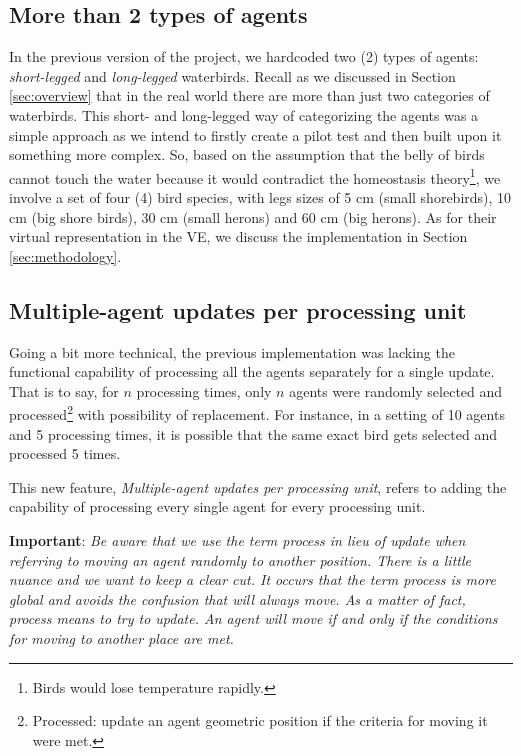 \subsection{More than 2 types of agents}
In the previous version of the project, we hardcoded two (2) types of agents: \emph{short-legged} and \emph{long-legged} waterbirds. Recall as we discussed in Section \ref{sec:overview} that in the real world there are more than just two categories of waterbirds. This short- and long-legged way of categorizing the agents was a simple approach as we intend to firstly create a pilot test and then built upon it something more complex. So, based on the assumption that the belly of birds cannot touch the water because it would contradict the homeostasis theory\footnote{Birds would lose temperature rapidly.}, we involve a set of four (4) bird species, with legs sizes of 5 cm (small shorebirds), 10 cm (big shore birds), 30 cm (small herons) and 60 cm (big herons). As for their virtual representation in the VE, we discuss the implementation in Section \ref{sec:methodology}.

\subsection{Multiple-agent updates per processing unit}
Going a bit more technical, the previous implementation was lacking the functional capability of processing all the agents separately for a single update. That is to say, for $n$ processing times, only $n$ agents were randomly selected and processed\footnote{Processed: update an agent geometric position if the criteria for moving it were met.} with possibility of replacement. For instance, in a setting of 10 agents and 5 processing times, it is possible that the same exact bird gets selected and processed 5 times.

This new feature, \emph{Multiple-agent updates per processing unit}, refers to adding the capability of processing every single agent for every processing unit.

\noindent
\textbf{Important}: \textit{Be aware that we use the term \emph{process} in lieu of \emph{update} when referring to moving an agent randomly to another position. There is a little nuance and we want to keep a clear cut. It occurs that the term \emph{process} is more global and avoids the confusion that will always move. As a matter of fact, process means to try to update. An agent will move if and only if the conditions for moving to another place are met.}

